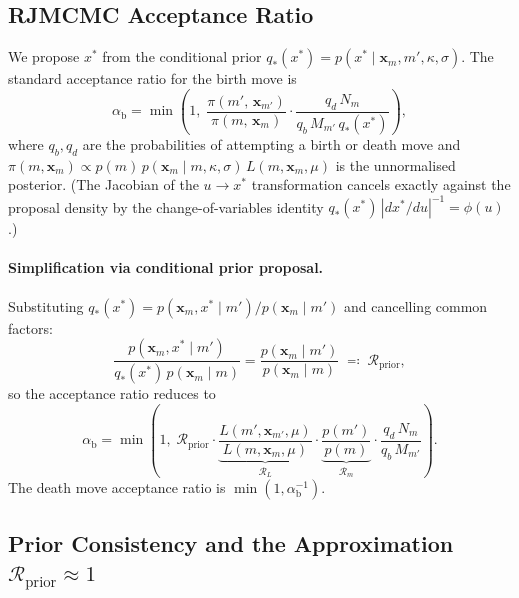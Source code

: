 \documentclass[11pt]{article}
\begin{document}
\subsection{RJMCMC Acceptance Ratio}
\label{sec:rj-acceptance}

We propose $x^*$ from the conditional prior $q_*(x^*)=p(x^*\mid\mathbf{x}_m,m',\kappa,\sigma)$.
The standard \citet{green1995} acceptance ratio for the birth move is
\begin{equation}
  \alpha_\mathrm{b} = \min\!\left(1,\;
    \frac{\pi(m',\,\mathbf{x}_{m'})}
         {\pi(m,\,\mathbf{x}_m)}\cdot
    \frac{q_d\,N_m}{q_b\,M_{m'}\,q_*(x^*)}
  \right),
  \label{eq:rj-raw}
\end{equation}
where $q_b,q_d$ are the probabilities of attempting a birth or death move and
$\pi(m,\mathbf{x}_m)\propto p(m)\,p(\mathbf{x}_m\mid m,\kappa,\sigma)\,L(m,\mathbf{x}_m,\mu)$
is the unnormalised posterior.  (The Jacobian of the $u\to x^*$ transformation
cancels exactly against the proposal density by the change-of-variables
identity $q_*(x^*)\,|dx^*/du|^{-1}=\phi(u)$.)

\paragraph{Simplification via conditional prior proposal.}
Substituting $q_*(x^*)=p(\mathbf{x}_m,x^*\mid m')/p(\mathbf{x}_m\mid m')$
and cancelling common factors:
\begin{equation}
  \frac{p(\mathbf{x}_m,x^*\mid m')}
       {q_*(x^*)\,p(\mathbf{x}_m\mid m)}
  = \frac{p(\mathbf{x}_m\mid m')}{p(\mathbf{x}_m\mid m)}
  \;\eqqcolon\; \mathcal{R}_\mathrm{prior},
\end{equation}
so the acceptance ratio reduces to
\begin{equation}
  \alpha_\mathrm{b} = \min\!\left(1,\;
    \mathcal{R}_\mathrm{prior}
    \cdot
    \underbrace{\frac{L(m',\mathbf{x}_{m'},\mu)}
                     {L(m,\mathbf{x}_m,\mu)}}_{\mathcal{R}_L}
    \cdot
    \underbrace{\frac{p(m')}{p(m)}}_{\mathcal{R}_m}
    \cdot\frac{q_d\,N_m}{q_b\,M_{m'}}
  \right).
  \label{eq:rj-acc}
\end{equation}
The death move acceptance ratio is $\min(1,\alpha_\mathrm{b}^{-1})$.

\subsection{Prior Consistency and the Approximation $\mathcal{R}_\mathrm{prior}\approx 1$}
\label{sec:rj-prior}
\end{document}
